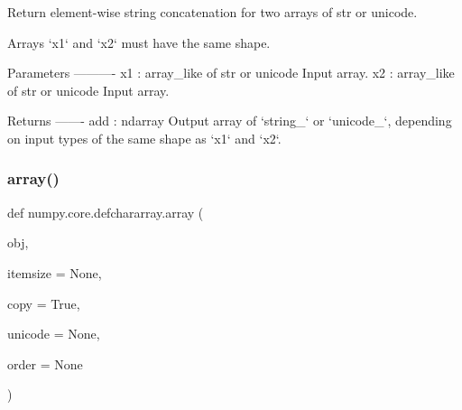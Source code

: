 \begin{DoxyVerb}Return element-wise string concatenation for two arrays of str or unicode.

Arrays `x1` and `x2` must have the same shape.

Parameters
----------
x1 : array_like of str or unicode
    Input array.
x2 : array_like of str or unicode
    Input array.

Returns
-------
add : ndarray
    Output array of `string_` or `unicode_`, depending on input types
    of the same shape as `x1` and `x2`.\end{DoxyVerb}
 \mbox{\label{namespacenumpy_1_1core_1_1defchararray_a9b0cb9668790067620e1e48968020872}} 
\subsubsection{\texorpdfstring{array()}{array()}}
{\footnotesize\ttfamily def numpy.\+core.\+defchararray.\+array (\begin{DoxyParamCaption}\item[{}]{obj,  }\item[{}]{itemsize = {\ttfamily None},  }\item[{}]{copy = {\ttfamily True},  }\item[{}]{unicode = {\ttfamily None},  }\item[{}]{order = {\ttfamily None} }\end{DoxyParamCaption})}

